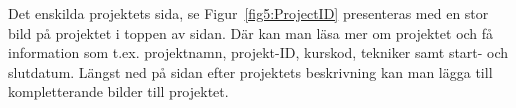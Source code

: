 \documentclass{TDP003mall}
\begin{document}
Det enskilda projektets sida, se Figur~\ref{fig5:ProjectID} presenteras med en stor bild på projektet i toppen av sidan.
Där kan man läsa mer om projektet och få information som t.ex. projektnamn, projekt-ID, kurskod, tekniker samt start- och slutdatum.
Längst ned på sidan efter projektets beskrivning kan man lägga till kompletterande bilder till projektet.
\end{document}
